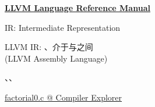 
\begin{frame}{}
	\begin{center}
		{\href{https://llvm.org/docs/LangRef.html}{\bf LLVM Language Reference Manual}}


		\vspace{0.50cm}
		IR: Intermediate Representation

		\vspace{0.50cm}
		LLVM IR: 、介于与之间 \\ [3pt]
		(LLVM Assembly Language)
	\end{center}
\end{frame}

\begin{frame}{}
\end{frame}

\begin{frame}{}
	\begin{center}

		\vspace{0.30cm}
		、、
	\end{center}
\end{frame}

\begin{frame}{}
	\begin{center}
		\href{https://godbolt.org/z/chnK35TcM}{factorial0.c @ Compiler Explorer}

		\vspace{0.30cm}
	\end{center}
\end{frame}

\begin{frame}{}
	\begin{center}

		\vspace{0.20cm}

		  


	\end{center}
\end{frame}


